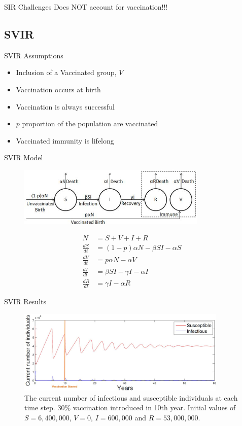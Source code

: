 \documentclass{beamer}
\begin{document}
\begin{frame} {SIR} {Challenges}
Does NOT account for vaccination!!!
\end{frame}

\subsection{SVIR}
\begin{frame} {SVIR} {Assumptions}
\begin{itemize}
\item {Inclusion of a Vaccinated group, $V$}
 \item{Vaccination occurs at birth}
 \item {Vaccination is always successful}
 \item {$p$ proportion of the population are vaccinated}
 \item {Vaccinated immunity is lifelong}
\end{itemize}
\end{frame}

\begin{frame} {SVIR} {Model}
\begin{figure}
\centering
\includegraphics[width=90mm]{SVIRModel.jpg}
\label{fig:SVIRpictoral}
\end{figure}
\begin{align*}
N &= S + V + I + R \\
\frac{dS}{dt} &= (1-p)\alpha N - \beta SI - \alpha S \\ 
\frac{dV}{dt} &= p\alpha N - \alpha V \\ 
\frac{dI}{dt} &= \beta SI - \gamma I - \alpha I \\ 
\frac{dR}{dt} &= \gamma I - \alpha R 
\end{align*}
\end{frame}

\begin{frame} {SVIR} {Results}
\begin{figure}
\centering
\includegraphics[width=100mm]{figsvir30.jpg}
\caption{The current number of infectious and susceptible individuals at each time step. 30\% vaccination introduced in 10th year. Initial values of $S=6,400,000$, $V=0$, $I=600,000$ and $R=53,000,000$.}
\end{figure}
\end{frame}
\end{document}
